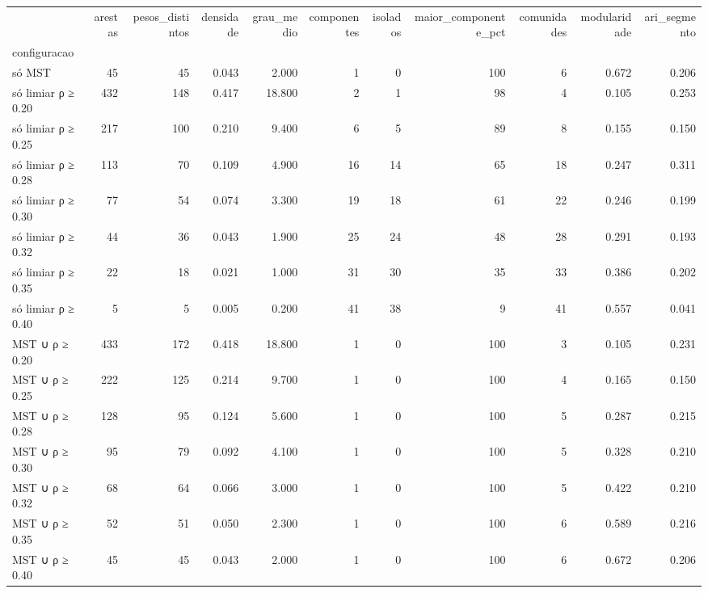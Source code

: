 \begin{tabular}{lrrrrrrrrrr}
\toprule
 & arestas & pesos\_distintos & densidade & grau\_medio & componentes & isolados & maior\_componente\_pct & comunidades & modularidade & ari\_segmento \\
configuracao &  &  &  &  &  &  &  &  &  &  \\
\midrule
só MST & 45 & 45 & 0.043 & 2.000 & 1 & 0 & 100 & 6 & 0.672 & 0.206 \\
só limiar ρ ≥ 0.20 & 432 & 148 & 0.417 & 18.800 & 2 & 1 & 98 & 4 & 0.105 & 0.253 \\
só limiar ρ ≥ 0.25 & 217 & 100 & 0.210 & 9.400 & 6 & 5 & 89 & 8 & 0.155 & 0.150 \\
só limiar ρ ≥ 0.28 & 113 & 70 & 0.109 & 4.900 & 16 & 14 & 65 & 18 & 0.247 & 0.311 \\
só limiar ρ ≥ 0.30 & 77 & 54 & 0.074 & 3.300 & 19 & 18 & 61 & 22 & 0.246 & 0.199 \\
só limiar ρ ≥ 0.32 & 44 & 36 & 0.043 & 1.900 & 25 & 24 & 48 & 28 & 0.291 & 0.193 \\
só limiar ρ ≥ 0.35 & 22 & 18 & 0.021 & 1.000 & 31 & 30 & 35 & 33 & 0.386 & 0.202 \\
só limiar ρ ≥ 0.40 & 5 & 5 & 0.005 & 0.200 & 41 & 38 & 9 & 41 & 0.557 & 0.041 \\
MST ∪ ρ ≥ 0.20 & 433 & 172 & 0.418 & 18.800 & 1 & 0 & 100 & 3 & 0.105 & 0.231 \\
MST ∪ ρ ≥ 0.25 & 222 & 125 & 0.214 & 9.700 & 1 & 0 & 100 & 4 & 0.165 & 0.150 \\
MST ∪ ρ ≥ 0.28 & 128 & 95 & 0.124 & 5.600 & 1 & 0 & 100 & 5 & 0.287 & 0.215 \\
MST ∪ ρ ≥ 0.30 & 95 & 79 & 0.092 & 4.100 & 1 & 0 & 100 & 5 & 0.328 & 0.210 \\
MST ∪ ρ ≥ 0.32 & 68 & 64 & 0.066 & 3.000 & 1 & 0 & 100 & 5 & 0.422 & 0.210 \\
MST ∪ ρ ≥ 0.35 & 52 & 51 & 0.050 & 2.300 & 1 & 0 & 100 & 6 & 0.589 & 0.216 \\
MST ∪ ρ ≥ 0.40 & 45 & 45 & 0.043 & 2.000 & 1 & 0 & 100 & 6 & 0.672 & 0.206 \\
\bottomrule
\end{tabular}
